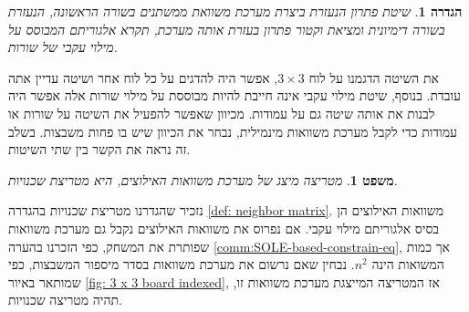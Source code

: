 \documentclass[12pt,leqno]{article}
\theoremstyle{theoremdd}
\newtheorem{definition}{הגדרה}[section]
\newtheorem{theorem}{משפט}[section]
\begin{document}
\begin{definition}
    \label{def: spanish way}
    שיטת פתרון הנעזרת ביצרת מערכת משוואת ממשתנים בשורה הראשונה,
    הנעזרת בשורה דימיונית
    ומציאת וקטור פתרון
    בעזרת אותה מערכת,
    תקרא 
    אלגוריתם המבוסס על מילוי עקבי של שורות.
\end{definition}
את השיטה הדגמנו על לוח 
$3 \times 3$,
אפשר היה להדגים על כל לוח אחר ושיטה עדיין אתה עובדת.
בנוסף, שיטת
מילוי עקבי אינה חייבת להיות מבוססת על מילוי שורות אלה 
אפשר היה לבנות את אותה שיטה גם על עמודות.
מכיוון שאפשר להפעיל את השיטה על שורות או עמודות 
כדי לקבל מערכת משוואות מינמילית, נבחר 
את הכיוון שיש בו פחות משבצות. 
בשלב זה נראה את הקשר בין שתי השיטות.
\begin{theorem}
    מטריצה מיצג של מערכת משוואות האילוצים, היא מטריצת שכנויות.
\end{theorem}
נזכיר שהגדרנו מטריצת שכנויות בהגדרה
\ref{def: neighbor matrix}.
משוואות האילוצים הן בסיס אלגוריתם מילוי עקבי.
אם נפרוס את משוואות האילוצים נקבל גם מערכת משוואות שפותרת את המשחק,
כפי הזכרנו בהערה 
\ref{comm:SOLE-based-constrain-eq},
אך כמות המשואות הינה 
$n^2$.
נבחין שאם נרשום את 
מערכת 
משוואות בסדר 
מיספור המשבצות,
כפי שמותאר באיור 
\ref{fig: 3 x 3 board indexed},
אז
המטריצה המייצגת מערכת משוואות זו, תהיה 
מטריצה שכנויות.
\end{document}
